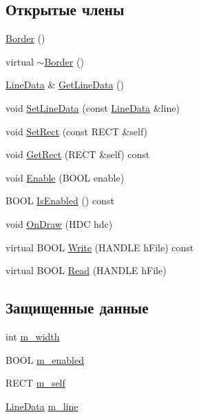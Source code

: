 \subsection*{Открытые члены}
\begin{DoxyCompactItemize}
\item 
\hyperlink{class_border_a10716f049d192f79c42cd4fcf370645c}{Border} ()
\item 
virtual \hyperlink{class_border_a1987ed890f751ecb1dc9f5108b3354a4}{$\sim$\-Border} ()
\item 
\hyperlink{class_line_data}{Line\-Data} \& \hyperlink{class_border_a45871191f531c8fcb72de61be821ab12}{Get\-Line\-Data} ()
\item 
void \hyperlink{class_border_a0408de555f494a1e9b29a2687d708582}{Set\-Line\-Data} (const \hyperlink{class_line_data}{Line\-Data} \&line)
\item 
void \hyperlink{class_border_a4898438c8fd6c56d45754c2d86136f95}{Set\-Rect} (const R\-E\-C\-T \&self)
\item 
void \hyperlink{class_border_acf0e8ea07dbbb061c3f62c46c695e7a3}{Get\-Rect} (R\-E\-C\-T \&self) const 
\item 
void \hyperlink{class_border_a0b754dcefef27bb04f912480d8ba4537}{Enable} (B\-O\-O\-L enable)
\item 
B\-O\-O\-L \hyperlink{class_border_adf4ed3d2ef47f57a6f119fa0076679e0}{Is\-Enabled} () const 
\item 
void \hyperlink{class_border_a5747393117829b21310b78c23b95b7e5}{On\-Draw} (H\-D\-C hdc)
\item 
virtual B\-O\-O\-L \hyperlink{class_border_a61f82208fd693839acd08d0a4e787b10}{Write} (H\-A\-N\-D\-L\-E h\-File) const 
\item 
virtual B\-O\-O\-L \hyperlink{class_border_a35655b3874c3230038e171f18e7286f2}{Read} (H\-A\-N\-D\-L\-E h\-File)
\end{DoxyCompactItemize}
\subsection*{Защищенные данные}
\begin{DoxyCompactItemize}
\item 
int \hyperlink{class_border_a3c00eea5388d2f3bcd32d49c61200dfa}{m\-\_\-width}
\item 
B\-O\-O\-L \hyperlink{class_border_a63465529cd801a7697daa260e52cc156}{m\-\_\-enabled}
\item 
R\-E\-C\-T \hyperlink{class_border_a9abf5eb45c217515cde39e9ba877dd5d}{m\-\_\-self}
\item 
\hyperlink{class_line_data}{Line\-Data} \hyperlink{class_border_a77593373329183467369fb08d4818338}{m\-\_\-line}
\end{DoxyCompactItemize}
